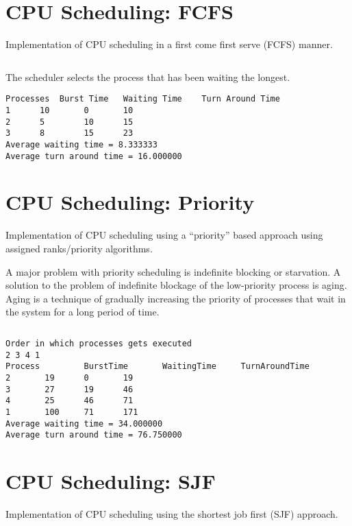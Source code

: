 \section{CPU Scheduling: FCFS}
\label{sec:cpu-scheduling}

Implementation of CPU scheduling in a first come first serve (FCFS) manner.

\inputminted[fontsize=\footnotesize,linenos,autogobble]{c}{code/fcfs.c}

The scheduler selects the process that has been waiting the longest.
\pagebreak

\begin{lstlisting}[style=output]
Processes  Burst Time   Waiting Time    Turn Around Time
1	   10		0		10
2	   5		10		15
3	   8		15		23
Average waiting time = 8.333333
Average turn around time = 16.000000
\end{lstlisting}

\section{CPU Scheduling: Priority}
\label{sec:cpu-scheduling-priority}

Implementation of CPU scheduling using a ``priority'' based approach using assigned ranks/priority algorithms.

A major problem with priority scheduling is indefinite blocking or starvation. A solution to the problem of indefinite blockage of the low-priority process is aging. Aging is a technique of gradually increasing the priority of processes that wait in the system for a long period of time.

\inputminted[fontsize=\footnotesize,linenos,autogobble]{c}{code/priority.c}

\begin{lstlisting}[style=output]
Order in which processes gets executed
2 3 4 1 
Process         BurstTime       WaitingTime     TurnAroundTime
2		19		0		19
3		27		19		46
4		25		46		71
1		100		71		171
Average waiting time = 34.000000
Average turn around time = 76.750000
\end{lstlisting}

\pagebreak

\section{CPU Scheduling: SJF}

Implementation of CPU scheduling using the shortest job first (SJF) approach.

